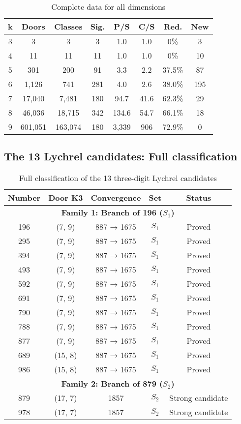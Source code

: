 \documentclass[12pt,a4paper]{article}
\theoremstyle{remark}
\begin{document}
\begin{table}[h]
\centering
\caption{Complete data for all dimensions}
\begin{tabular}{cccccccc}
\toprule
\textbf{k} & \textbf{Doors} & \textbf{Classes} & \textbf{Sig.} & \textbf{P/S} & \textbf{C/S} & \textbf{Red.} & \textbf{New}\\
\midrule
3 & 3 & 3 & 3 & 1.0 & 1.0 & 0\% & 3\\
4 & 11 & 11 & 11 & 1.0 & 1.0 & 0\% & 10\\
5 & 301 & 200 & 91 & 3.3 & 2.2 & 37.5\% & 87\\
6 & 1,126 & 741 & 281 & 4.0 & 2.6 & 38.0\% & 195\\
7 & 17,040 & 7,481 & 180 & 94.7 & 41.6 & 62.3\% & 29\\
8 & 46,036 & 18,715 & 342 & 134.6 & 54.7 & 66.1\% & 18\\
9 & 601,051 & 163,074 & 180 & 3,339 & 906 & 72.9\% & 0\\
\bottomrule
\end{tabular}
\end{table}

\subsection{The 13 Lychrel candidates: Full classification}

\begin{table}[h]
\centering
\caption{Full classification of the 13 three-digit Lychrel candidates}
\begin{tabular}{ccccc}
\toprule
\textbf{Number} & \textbf{Door K3} & \textbf{Convergence} & \textbf{Set} & \textbf{Status}\\
\midrule
\multicolumn{5}{c}{\textbf{Family 1: Branch of 196 ($S_1$)}}\\
\midrule
196 & (7, 9) & 887 → 1675 & $S_1$ & Proved\\
295 & (7, 9) & 887 → 1675 & $S_1$ & Proved\\
394 & (7, 9) & 887 → 1675 & $S_1$ & Proved\\
493 & (7, 9) & 887 → 1675 & $S_1$ & Proved\\
592 & (7, 9) & 887 → 1675 & $S_1$ & Proved\\
691 & (7, 9) & 887 → 1675 & $S_1$ & Proved\\
790 & (7, 9) & 887 → 1675 & $S_1$ & Proved\\
788 & (7, 9) & 887 → 1675 & $S_1$ & Proved\\
877 & (7, 9) & 887 → 1675 & $S_1$ & Proved\\
689 & (15, 8) & 887 → 1675 & $S_1$ & Proved\\
986 & (15, 8) & 887 → 1675 & $S_1$ & Proved\\
\midrule
\multicolumn{5}{c}{\textbf{Family 2: Branch of 879 ($S_2$)}}\\
\midrule
879 & (17, 7) & 1857 & $S_2$ & Strong candidate\\
978 & (17, 7) & 1857 & $S_2$ & Strong candidate\\
\bottomrule
\end{tabular}
\end{table}
\end{document}
